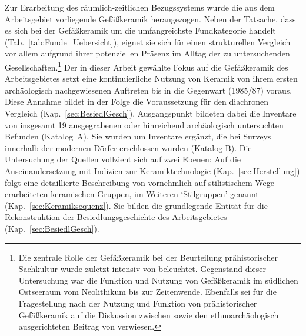 \begin{multicols}{2}
Zur Erarbeitung des räumlich-zeitlichen Bezugssystems wurde die aus dem Arbeitsgebiet vorliegende Gefäßkeramik herangezogen. Neben der Tatsache, dass es sich bei der Gefäßkeramik um die umfangreichste Fundkategorie handelt (Tab.~\ref{tab:Funde_Uebersicht}), eignet sie sich für einen strukturellen Vergleich vor allem aufgrund ihrer potenziellen Präsenz im Alltag der zu untersuchenden Gesellschaften.\footnote{Die zentrale Rolle der Gefäßkeramik bei der Beurteilung prähistorischer Sachkultur wurde zuletzt intensiv von \textcite{Saev.2015} beleuchtet. Gegenstand dieser Untersuchung war die Funktion und Nutzung von Gefäßkeramik im südlichen Ostseeraum vom Neolithikum bis zur Zeitenwende. Ebenfalls sei für die Fragestellung nach der Nutzung und Funktion von prähistorischer Gefäßkeramik auf die Diskussion zwischen \textcites{Riemer.1997}{Wotzka.1997}{Veit.1997} sowie den ethnoarchäologisch ausgerichteten Beitrag von \textcite{Knopf.2009} verwiesen.} Der in dieser Arbeit gewählte Fokus auf die Gefäßkeramik des Arbeitsgebietes setzt eine kontinuierliche Nutzung von Keramik von ihrem ersten archäologisch nachgewiesenen Auftreten bis in die Gegenwart (1985/87) voraus. Diese Annahme bildet in der Folge die Voraussetzung für den diachronen Vergleich (Kap.~\ref{sec:BesiedlGesch}). Ausgangspunkt bildeten dabei die Inventare von insgesamt 19 ausgegrabenen oder hinreichend archäologisch untersuchten Befunden (Katalog~A). Sie wurden um Inventare ergänzt, die bei Surveys innerhalb der modernen Dörfer erschlossen wurden (Katalog B). Die Untersuchung der Quellen vollzieht sich auf zwei Ebenen: Auf die Auseinandersetzung mit Indizien zur Keramiktechnologie (Kap.~\ref{sec:Herstellung}) folgt eine detaillierte Beschreibung von vornehmlich auf stilistischem Wege erarbeiteten keramischen Gruppen, im Weiteren \enquote*{Stilgruppen} genannt (Kap.~\ref{sec:Keramiksequenz}). Sie bilden die grundlegende Entität für die Rekonstruktion der Besiedlungsgeschichte des Arbeitsgebietes (Kap.~\ref{sec:BesiedlGesch}).


\end{multicols}
